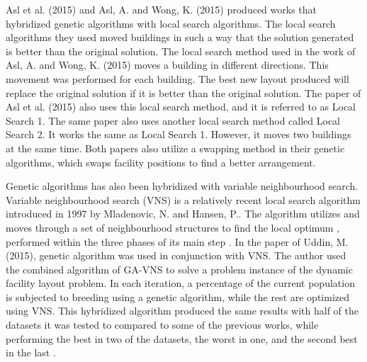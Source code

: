 Asl et al. (2015) \cite{Asl2015} and Asl, A. and Wong, K. (2015) \cite{Asl2015a} produced works that hybridized genetic algorithms with local search algorithms. The local search algorithms they used moved buildings in such a way that the solution generated is better than the original solution. The local search method used in the work of Asl, A. and Wong, K. (2015) moves a building in different directions. This movement was performed for each building. The best new layout produced will replace the original solution if it is better than the original solution. The paper of Asl et al. (2015) also uses this local search method, and it is referred to as Local Search 1. The same paper also uses another local search method called Local Search 2. It works the same as Local Search 1. However, it moves two buildings at the same time. Both papers also utilize a swapping method in their genetic algorithms, which swaps facility positions to find a better arrangement.

Genetic algorithms has also been hybridized with variable neighbourhood search. Variable neighbourhood search (VNS) is a relatively recent local search algorithm introduced in 1997 by Mladenovic, N. and Hansen, P.. The algorithm utilizes and moves through a set of neighbourhood structures to find the local optimum \cite{Hansen2018}, performed within the three phases of its main step \cite{Hansen2017}. In the paper of Uddin, M. (2015), genetic algorithm was used in conjunction with VNS. The author used the combined algorithm of GA-VNS to solve a problem instance of the dynamic facility layout problem. In each iteration, a percentage of the current population is subjected to breeding using a genetic algorithm, while the rest are optimized using VNS. This hybridized algorithm produced the same results with half of the datasets it was tested to compared to some of the previous works, while performing the best in two of the datasets, the worst in one, and the second best in the last \cite{Uddin2015}.

